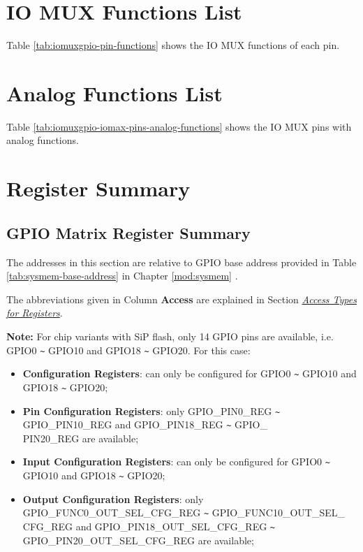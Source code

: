 \documentclass[main\_\_EN.tex]{subfiles}
\begin{document}
\begin{landscape}



\end{landscape}
\section{IO MUX Functions List}
\label{sec:iomux_pads}
Table \ref{tab:iomuxgpio-pin-functions} shows the IO MUX functions of each pin.



\section{Analog Functions List}
\label{sec:rtcmux_pins}

Table \ref{tab:iomuxgpio-iomax-pins-analog-functions} shows the IO MUX pins with analog functions.




\hypertarget{iomuxgpio-reg-summ}{}
\section{Register Summary}
\subsection{GPIO Matrix Register Summary}
The addresses in this section are relative to GPIO base address provided in Table \ref{tab:sysmem-base-address} in Chapter \ref{mod:sysmem} \textit{}.

The abbreviations given in Column \textbf{Access} are explained in Section \hyperref[glossary-access-types]{\textit{Access Types for Registers}}.

\textbf{Note:} For chip variants with SiP flash, only 14 GPIO pins are available, i.e. GPIO0 \verb+~+ GPIO10 and GPIO18 \verb+~+ GPIO20. For this case:
\begin{itemize}
    \item \textbf{Configuration Registers}: can only be configured for GPIO0 \verb+~+ GPIO10 and GPIO18 \verb+~+ GPIO20;
    \item \textbf{Pin Configuration Registers}: only GPIO\_PIN0\_REG \verb+~+ GPIO\_PIN10\_REG and GPIO\_PIN18\_REG \verb+~+ GPIO\_\\PIN20\_REG are available;
    \item \textbf{Input Configuration Registers}: can only be configured for GPIO0 \verb+~+ GPIO10 and GPIO18 \verb+~+ GPIO20;
    \item \textbf{Output Configuration Registers}: only  GPIO\_FUNC0\_OUT\_SEL\_CFG\_REG \verb+~+ GPIO\_FUNC10\_OUT\_SEL\_\\CFG\_REG and GPIO\_PIN18\_OUT\_SEL\_CFG\_REG \verb+~+ GPIO\_PIN20\_OUT\_SEL\_CFG\_REG are available;
\end{itemize}
\end{document}
